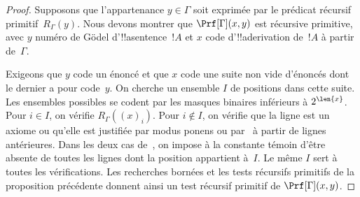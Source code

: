 \documentclass[../../../include/open-logic-section]{subfiles}
\begin{document}
\begin{proof}
Supposons que l'appartenance $y \in \Gamma$ soit exprimée par le
prédicat récursif primitif~$R_\Gamma(y)$. Nous devons montrer que
$\Prf[\Gamma](x, y)$ est récursive primitive, avec $y$ numéro de
G\"odel d'!!a{sentence}~$!A$ et $x$ code d'!!a{derivation}
de~$!A$ à partir de~$\Gamma$.

Exigeons que $y$ code un énoncé et que $x$ code une suite
non vide d'énoncés dont le dernier a pour code~$y$. On cherche
un ensemble $I$ de positions dans cette suite. Les ensembles
possibles se codent par les masques binaires inférieurs à
$2^{\len{x}}$. Pour $i\in I$, on vérifie $R_\Gamma((x)_i)$.
Pour $i\notin I$, on vérifie que la ligne est un axiome ou
qu'elle est justifiée par modus ponens ou par~\QR{} à partir de
lignes antérieures. Dans les deux cas de~\QR, on impose à
la constante témoin d'être absente de toutes les lignes
dont la position appartient à~$I$. Le même $I$ sert à toutes
les vérifications. Les recherches bornées et les tests
récursifs primitifs de la proposition précédente donnent ainsi
un test récursif primitif de $\Prf[\Gamma](x,y)$.
\end{proof}
\end{document}
